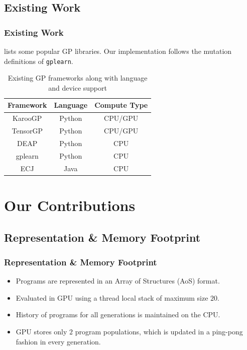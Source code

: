 \documentclass{beamer}
\begin{document}
\subsection{Existing Work}
\begin{frame}
  \frametitle{Existing Work}
   lists some popular GP libraries. Our implementation follows the mutation definitions of \texttt{gplearn}. 
  \begin{table}
    \begin{center}
      \begin{tabular}[c]{ccc}
        \toprule
        \textbf{Framework} &   \textbf{Language} & \textbf{Compute Type} \\
        \midrule
        KarooGP & Python & CPU/GPU \\
        TensorGP & Python & CPU/GPU \\
        DEAP & Python & CPU \\
        gplearn  & Python & CPU \\
        ECJ & Java & CPU \\
        \bottomrule
      \end{tabular}
      \caption{Existing GP frameworks along with language and device support}
      \label{tab:otherlibs}
    \end{center}
  \end{table}
\end{frame}

\section{Our Contributions}

\subsection{Representation \& Memory Footprint}
\begin{frame}
  \frametitle{Representation \& Memory Footprint}
  \begin{itemize}
    \item Programs are represented in an Array of Structures (AoS) format.
    \item Evaluated in GPU using a thread local stack of maximum size $20$.
    \item History of programs for all generations is maintained on the CPU. 
    \item GPU stores only $2$ program populations, which is updated in a ping-pong fashion in every generation.
  \end{itemize}
\end{frame}
\end{document}
